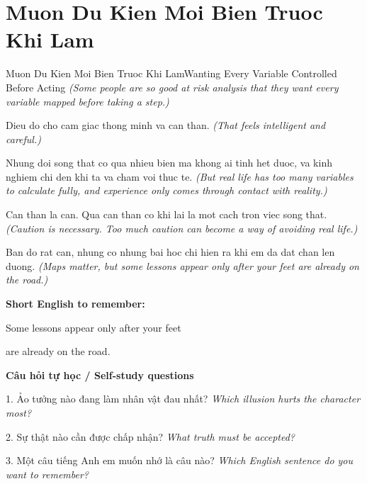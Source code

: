 \section{Muon Du Kien Moi Bien Truoc Khi Lam}
\begin{truyen}{Muon Du Kien Moi Bien Truoc Khi Lam}{Wanting Every Variable Controlled Before Acting}
\textit{(Some people are so good at risk analysis that they want every variable mapped before taking a step.)}

Dieu do cho cam giac thong minh va can than.
\textit{(That feels intelligent and careful.)}

Nhung doi song that co qua nhieu bien ma khong ai tinh het duoc, va kinh nghiem chi den khi ta va cham voi thuc te.
\textit{(But real life has too many variables to calculate fully, and experience only comes through contact with reality.)}

Can than la can. Qua can than co khi lai la mot cach tron viec song that.
\textit{(Caution is necessary. Too much caution can become a way of avoiding real life.)}

\end{truyen}

\begin{baihoc}
Ban do rat can, nhung co nhung bai hoc chi hien ra khi em da dat chan len duong.
\textit{(Maps matter, but some lessons appear only after your feet are already on the road.)}
\end{baihoc}

\begin{ghinhoanh}
\textbf{Short English to remember:}

Some lessons appear only after your feet

are already on the road.

\end{ghinhoanh}

\begin{tuhocnhanh}
\textbf{Câu hỏi tự học / Self-study questions}

1. Ảo tưởng nào đang làm nhân vật đau nhất? \textit{Which illusion hurts the character most?}

2. Sự thật nào cần được chấp nhận? \textit{What truth must be accepted?}

3. Một câu tiếng Anh em muốn nhớ là câu nào? \textit{Which English sentence do you want to remember?}
\end{tuhocnhanh}
\ngancach

